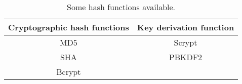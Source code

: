 	\begin{table}[h!]
	\begin{center}
		\begin{tabular}{|c|c|}
			\hline
			\textbf{Cryptographic hash functions} & \textbf{Key derivation function}\\\hline
			MD5 & Scrypt \\
			SHA & PBKDF2 \\
			Bcrypt & \\\hline
		\end{tabular}
		\caption{Some hash functions available.}
		\label{tab:table11}
	\end{center}
\end{table}